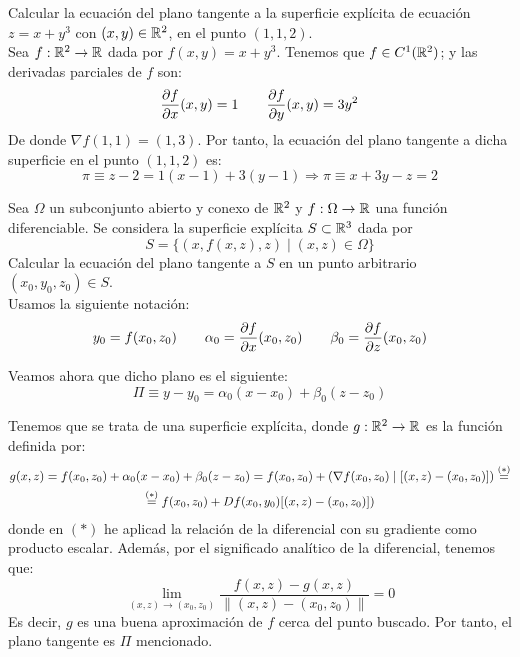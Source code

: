 \begin{ejercicio}
    Calcular la ecuación del plano tangente a la superficie explícita de ecuación $z = x + y^3$ con $(x,y)\in\mathbb{R}^2$, en el punto $(1,1,2)$.\\

    \noindent
    Sea $f:\mathbb{R}^2\to \mathbb{R}$ dada por $f(x,y) = x+y^3$. Tenemos que $f\in C^1(\mathbb{R}^2)$; y las derivadas parciales de $f$ son:
    \begin{equation*}
        \frac{\partial f}{\partial x}(x,y) = 1
        \qquad 
        \frac{\partial f}{\partial y}(x,y) = 3y^2
    \end{equation*}
    De donde $\nabla f(1,1)=(1,3)$. Por tanto, la ecuación del plano tangente a dicha superficie en el punto $(1,1,2)$ es:
    \begin{equation*}
        \pi\equiv z-2 = 1(x-1) + 3(y-1) \Longrightarrow \pi\equiv x+3y-z=2
    \end{equation*}
\end{ejercicio}

\begin{ejercicio}
    Sea $\Omega$ un subconjunto abierto y conexo de $\mathbb{R}^2$ y $f:\Omega\to \mathbb{R}$ una función diferenciable. Se considera la superficie explícita $S\subset \mathbb{R}^3$ dada por
    \begin{equation*}
        S=\{(x,f(x,z), z)\mid (x,z)\in \Omega\}
    \end{equation*}
    Calcular la ecuación del plano tangente a $S$ en un punto arbitrario $(x_0,y_0,z_0)\in S$.\\

    \noindent
    Usamos la siguiente notación:
    \begin{equation*}
        y_0=f(x_0,z_0) \qquad \alpha_0 = \frac{\partial f}{\partial x}(x_0, z_0) \qquad \beta_0 = \frac{\partial f}{\partial z}(x_0, z_0)
    \end{equation*}

    Veamos ahora que dicho plano es el siguiente:
    \begin{equation*}
        \Pi \equiv y-y_0 = \alpha_0(x-x_0) + \beta_0(z-z_0)
    \end{equation*}

    Tenemos que se trata de una superficie explícita, donde $g:\mathbb{R}^2\to \mathbb{R}$ es la función definida por:
    \begin{multline*}
        g(x,z) = f(x_0,z_0) + \alpha_0(x-x_0) + \beta_0(z-z_0) = f(x_0,z_0) + (\nabla f(x_0,z_0)\mid [(x,z) - (x_0,z_0)]) \stackrel{(\ast)}{=}\\
        \stackrel{(\ast)}{=} f(x_0,z_0) + Df(x_0,y_0)[(x,z) - (x_0,z_0)])
    \end{multline*}
    donde en $(\ast)$ he aplicad la relación de la diferencial con su gradiente como producto escalar. Además, por el significado analítico de la diferencial, tenemos que:
    \begin{equation*}
        \lim_{(x,z)\to (x_0,z_0)} \frac{f(x,z) - g(x,z)}{\|(x,z)-(x_0,z_0)\|} = 0
    \end{equation*}
    Es decir, $g$ es una buena aproximación de $f$ cerca del punto buscado. Por tanto, el plano tangente es $\Pi$ mencionado.
\end{ejercicio}


